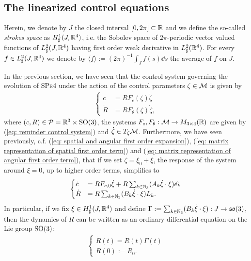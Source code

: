 \subsection{The linearized control equations}
Herein, we denote by $J$ the closed interval  $[0,2\pi] \subset \mathbb{R}$ and we define the so-called \emph{strokes space} as $H_\sharp^1(J, \mathbb{R}^4)$, i.e. the Sobolev space of $2\pi$-periodic vector valued functions of $L_{\sharp}^2(J, \mathbb{R}^4)$ having first order weak derivative in $L_{\sharp}^2(\mathbb{R}^4)$. For every $f \in L^{2}_{\sharp}(J, \mathbb{R}^4)$ we denote by $\langle f \rangle := (2\pi)^{-1} \int_{J} f(s) \dd s$ the average of $f$ on $J$.

In the previous section, we have seen that the control system governing the evolution of \textsc{SPr4} under the action of the control parameters $\zeta \in \mathcal{M}$ is given by
\begin{align}
\begin{cases}
	\dot{c} &= R F_c(\zeta) \dot{\zeta}\\
	\dot{R} &= R F_{\theta}(\zeta) \dot{\zeta},
\end{cases}
\end{align}
where $(c,R) \in \mathcal{P} = \mathbb{R}^3 \times \operatorname{SO}(3)$, the systems $F_{c}, F_{\theta}: \mathcal{M} \to M_{3 \times
 4}(\mathbb{R})$ are given by (\ref{eq: reminder control system}) and $\dot{\zeta}  \in T_{\zeta}\mathcal{M}$. Furthermore, we have seen previously, c.f. (\ref{eq: spatial and angular first order expansion}), (\ref{eq: matrix representation of spatial first order term}) and (\ref{eq: matrix representation of angular first order term}), that if we set $\zeta = \xi_0 + \xi$, the response of the system around $\xi = 0$, up to higher order terms, simplifies to
 \begin{align}
 \label{eq: dynamics first approx}
 \begin{cases}
 	\dot{c} &= R F_{c,0} \dot{\xi} + R \sum_{k \in \mathbb{N}_3}(A_k \dot{\xi} \cdot \xi)\hat{e_k}\\
 	\dot{R} &= R \sum_{k \in \mathbb{N}_3} (B_k \dot{\xi} \cdot \xi) L_k.
 \end{cases}
 \end{align}
In particular, if we fix $\xi \in H^1_{\sharp}(J, \mathbb{R}^4)$ and define $\Gamma := \sum_{k \in \mathbb{N}_3} (B_k \dot{\xi} \cdot \xi): J \to \mathfrak{so}(3)$, then the dynamics of $R$ can be written as an ordinary differential equation on the Lie group $\operatorname{SO}(3)$:
\begin{align}
\label{eq: orientation ode}
\begin{cases}
	\dot{R}(t) = R(t) \Gamma(t)\\
	R(0) := R_0.
\end{cases}
\end{align}

